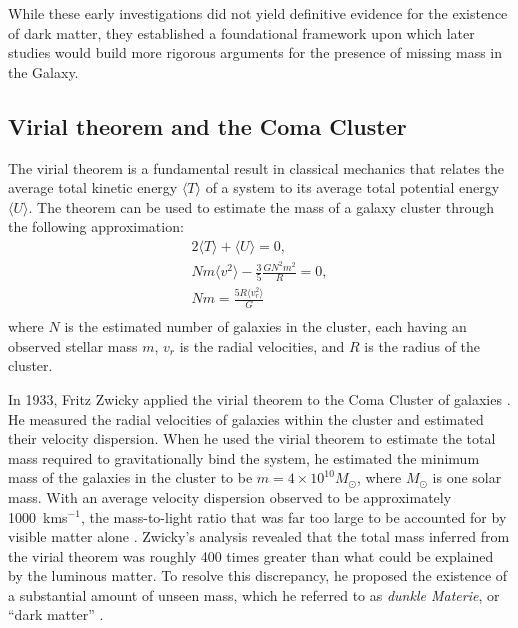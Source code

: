 While these early investigations did not yield definitive evidence for the existence of dark matter, they established a foundational framework upon which later studies would build more rigorous arguments for the presence of missing mass in the Galaxy.

\subsection{Virial theorem and the Coma Cluster}\label{sec:DMOverview/ViralTheorem}
The virial theorem is a fundamental result in classical mechanics that relates the average total kinetic energy $\langle T \rangle$ of a system to its average total potential energy $\langle U \rangle$. The theorem can be used to estimate the mass of a galaxy cluster through the following approximation:
\begin{equation}
\begin{split}
2\langle T \rangle + \langle U \rangle = 0, \\
Nm\langle v^2\rangle - \frac{3}{5}\frac{GN^2m^2}{R}=0,\\
Nm=\frac{5R\langle v_r^2 \rangle}{G}\\
\end{split}
\label{eq:DMOverview/virial}
\end{equation}
where $N$ is the estimated number of galaxies in the cluster, each having an observed stellar mass $m$, $v_r$ is the radial velocities, and $R$ is the radius of the cluster.

In 1933, Fritz Zwicky applied the virial theorem to the Coma Cluster of galaxies \cite{Zwicky1933}. He measured the radial velocities of galaxies within the cluster and estimated their velocity dispersion. When he used the virial theorem to estimate the total mass required to gravitationally bind the system, he estimated the minimum mass of the galaxies in the cluster to be $m=4\times 10^{10}M_{\odot}$, where $M_{\odot}$ is one solar mass. With an average velocity dispersion observed to be approximately 1000~kms$^{-1}$, the mass-to-light ratio that was far too large to be accounted for by visible matter alone \cite{HistoryofDM}. Zwicky’s analysis revealed that the total mass inferred from the virial theorem was roughly 400 times greater than what could be explained by the luminous matter. To resolve this discrepancy, he proposed the existence of a substantial amount of unseen mass, which he referred to as \textit{dunkle Materie}, or “dark matter” \cite{Zwicky1933}.

